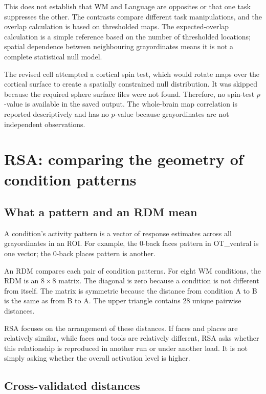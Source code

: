 \documentclass[11pt,a4paper]{article}
\begin{document}
This does not establish that WM and Language are opposites or that one task suppresses the other. The contrasts compare different task manipulations, and the overlap calculation is based on thresholded maps. The expected-overlap calculation is a simple reference based on the number of thresholded locations; spatial dependence between neighbouring grayordinates means it is not a complete statistical null model.

The revised cell attempted a cortical spin test, which would rotate maps over the cortical surface to create a spatially constrained null distribution. It was skipped because the required sphere surface files were not found. Therefore, no spin-test \(p\)-value is available in the saved output. The whole-brain map correlation is reported descriptively and has no \(p\)-value because grayordinates are not independent observations.

\section{RSA: comparing the geometry of condition patterns}

\subsection{What a pattern and an RDM mean}

A condition's activity pattern is a vector of response estimates across all grayordinates in an ROI. For example, the 0-back faces pattern in OT\_ventral is one vector; the 0-back places pattern is another.

An RDM compares each pair of condition patterns. For eight WM conditions, the RDM is an \(8\times8\) matrix. The diagonal is zero because a condition is not different from itself. The matrix is symmetric because the distance from condition A to B is the same as from B to A. The upper triangle contains 28 unique pairwise distances.

RSA focuses on the arrangement of these distances. If faces and places are relatively similar, while faces and tools are relatively different, RSA asks whether this relationship is reproduced in another run or under another load. It is not simply asking whether the overall activation level is higher.

\subsection{Cross-validated distances}
\end{document}
